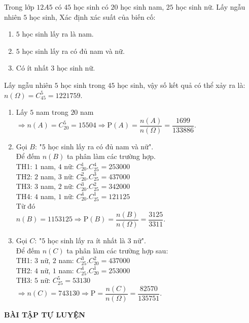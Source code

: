 \begin{vd}%
	Trong lớp $12A5$ có $45$ học sinh có $20$ học sinh nam, $25$ học sinh nữ. Lấy ngẫu nhiên $5$ học sinh, Xác định xác suất của biến cố:
	\begin{enumerate}
		\item $5$ học sinh lấy ra là nam.
		\item $5$ học sinh lấy ra có đủ nam và nữ.
		\item Có ít nhất $3$ học sinh nữ.
	\end{enumerate}
	\loigiai
	{
		Lấy ngẫu nhiên $5$ học sinh trong $45$ học sinh, vậy số kết quả có thể xảy ra là:\\
		$n(\Omega)=C^5_{45}= 1221759$.
		\begin{enumerate}
			\item 
			Lấy $5$ nam trong $20$ nam\\ $\Rightarrow n(A)=C^5_{20}=15504\Rightarrow \mathrm{P}(A)=\dfrac{n(A)}{n(\Omega)}=\dfrac{1699}{133886}$.
			\item Gọi $B$: "$5$ học sinh lấy ra có đủ nam và nữ".\\
			Để đếm $n(B)$ ta phân làm các trường hợp.\\
			TH1: $1$ nam, $4$ nữ: $C^1_{20}.C^4_{25}=253000$\\
			TH2: $2$ nam, $3$ nữ: $C^2_{20}.C^3_{25}=437000 $ \\
			TH3: $3$ nam, $2$ nữ: $C^3_{20}. C^2_{25}=342000$ \\
			TH4: $4$ nam, $1$ nữ: $C^4_{20}.C^1_{25}=121125$ \\
			Từ đó\\
			$n(B)=1153125\Rightarrow\mathrm{P}(B)=\dfrac{n(B)}{n(\Omega)}=\dfrac{3125}{3311}$.
			\item Gọi $C$: "$5$ học sinh lấy ra ít nhất là $3$ nữ".\\
			Để đếm $n(C)$ ta phân làm các trường hợp sau:\\
			TH1: $3$ nữ, $2$ nam: $C^3_{25}.C^2_{20}=437000$ \\
			TH2: $4$ nữ, $1$ nam: $C^4_{25}.C^1_{20}=253000$  \\
			TH3: $5$ nữ: $C^5_{25}=53130$ \\
			$\Rightarrow n(C)=743130\Rightarrow \mathrm{P}=\dfrac{n(C)}{n(\Omega)}=\dfrac{82570}{135751} $.
		\end{enumerate}
	}	
\end{vd}
\begin{center}
	\textbf{BÀI TẬP TỰ LUYỆN}
\end{center}
